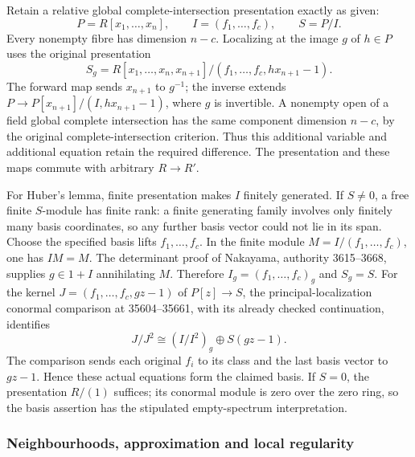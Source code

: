 Retain a relative global complete-intersection presentation exactly as given: \[
P=R[x_1,\ldots,x_n],\qquad I=(f_1,\ldots,f_c),\qquad S=P/I.
\] Every nonempty fibre has dimension \(n-c\). Localizing at the image \(g\) of \(h\in P\) uses the original presentation \[
S_g=R[x_1,\ldots,x_n,x_{n+1}]/(f_1,\ldots,f_c,hx_{n+1}-1).
\] The forward map sends \(x_{n+1}\) to \(g^{-1}\); the inverse extends \(P\to P[x_{n+1}]/(I,hx_{n+1}-1)\), where \(g\) is invertible. A nonempty open of a field global complete intersection has the same component dimension \(n-c\), by the original complete-intersection criterion. Thus this additional variable and additional equation retain the required difference. The presentation and these maps commute with arbitrary \(R\to R'\).

For Huber's lemma, finite presentation makes \(I\) finitely generated. If \(S\ne0\), a free finite \(S\)-module has finite rank: a finite generating family involves only finitely many basis coordinates, so any further basis vector could not lie in its span. Choose the specified basis lifts \(f_1,\ldots,f_c\). In the finite module \(M=I/(f_1,\ldots,f_c)\), one has \(IM=M\). The determinant proof of Nakayama, authority 3615--3668, supplies \(g\in1+I\) annihilating \(M\). Therefore \(I_g=(f_1,\ldots,f_c)_g\) and \(S_g=S\). For the kernel \(J=(f_1,\ldots,f_c,gz-1)\) of \(P[z]\to S\), the principal-localization conormal comparison at 35604--35661, with its already checked continuation, identifies \[
J/J^2\cong (I/I^2)_g\oplus S(gz-1).
\] The comparison sends each original \(f_i\) to its class and the last basis vector to \(gz-1\). Hence these actual equations form the claimed basis. If \(S=0\), the presentation \(R/(1)\) suffices; its conormal module is zero over the zero ring, so the basis assertion has the stipulated empty-spectrum interpretation.

\subsubsection{Neighbourhoods, approximation and local regularity}\label{neighbourhoods-approximation-and-local-regularity}

